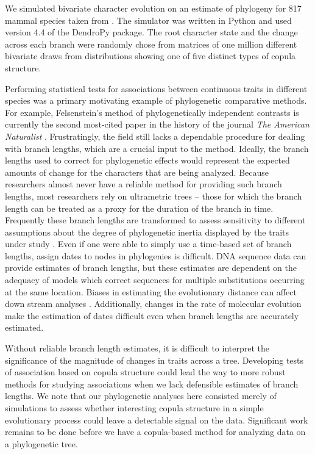 We simulated bivariate character evolution on an estimate of 
  phylogeny for 817 mammal species taken from \citep{GenoudIM2018}.
The simulator was written in Python and used version 4.4 of 
  the DendroPy \citep{DendroPy} package.
The root character state and the change across each branch
  were randomly chose from matrices of one million different
  bivariate draws from distributions showing one of five
  distinct types of copula structure.


Performing statistical tests for associations between continuous traits in different species
    was a primary motivating example of phylogenetic comparative methods.
For example, Felsenstein's method of phylogenetically independent contrasts 
    \citep{Felsenstein1985} is currently the second most-cited paper in the history
    of the journal {\em The American Naturalist} \citep{HueyGT2019}.
Frustratingly, the field still lacks a dependable procedure for dealing with branch lengths, 
    which are a crucial input to the method.
Ideally, the branch lengths used to correct for phylogenetic effects would represent
    the expected amounts of change for the characters that are being analyzed.
Because researchers almost never have a reliable method for providing such branch lengths,
    most researchers rely on ultrametric trees -- those for which the branch
    length can be treated as a proxy for the duration of the branch in time.
Frequently these branch lengths are transformed to assess sensitivity to different 
    assumptions about the degree of phylogenetic inertia displayed by the traits
    under study \citep[See recent reviews, ][]{Ives2018,Harmon2018}.
Even if one were able to simply use a time-based set of branch lengths, assign
    dates to nodes in phylogenies is difficult.
DNA sequence data can provide estimates of branch lengths, but these estimates
    are dependent on the adequacy of models which correct sequences for multiple
    substitutions occurring at the same location.
Biases in estimating the evolutionary distance can affect down stream analyses \citep[See][]{Phillips2009}.
Additionally, changes
    in the rate of molecular evolution make the estimation of dates difficult \citep[See][]{HeathM2014} even when branch lengths are accurately estimated.

Without reliable branch length estimates, it is difficult to interpret the significance
    of the magnitude of changes in traits across a tree.
Developing tests of association based on copula structure could lead the way to more
    robust methods for studying associations when we lack defensible estimates of
    branch lengths.
We note that our phylogenetic analyses here consisted merely of simulations to assess
    whether interesting copula structure in a simple evolutionary process could 
    leave a detectable signal on the data.
Significant work remains to be done before we have a copula-based method for 
    analyzing data on a phylogenetic tree.

